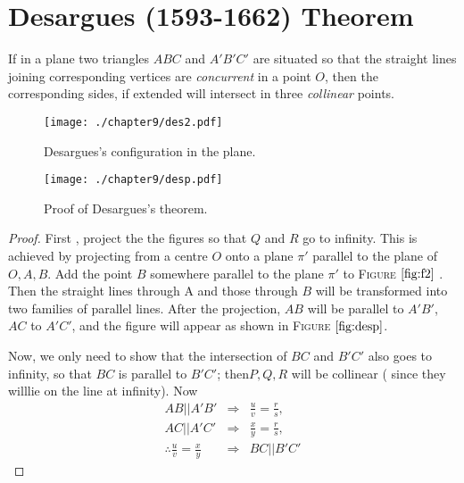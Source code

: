 \section{Desargues (1593-1662) Theorem}
\begin{theorem}

If in a plane two triangles $ABC$ and $A'B'C'$ are situated so that the straight lines joining corresponding vertices are \emph{concurrent} in a point $O$, then the corresponding sides, if extended will intersect in three \emph{collinear} points. 

\begin{figure}[htbp] %
\centering
\texttt{[image: ./chapter9/des2.pdf]} 
\caption{Desargues's configuration in the plane.} 
\label{fig:des2}
\end{figure}

\begin{figure}[htbp] %
\centering
\texttt{[image: ./chapter9/desp.pdf]} 
\caption{Proof of Desargues's theorem.} 
\label{fig:desp}
\end{figure}

\begin{proof}

First , project the the figures so that $Q$ and $R$ go to infinity. This is achieved by projecting from a centre $O$ onto a plane $\pi'$ parallel to the plane of $O, A, B$. Add the point $B$ somewhere parallel to the plane $\pi'$ to \textsc{Figure $\ref{fig:f2}$} . Then the straight lines through A and those through $B$ will be transformed into two families of parallel lines. After the projection, $AB$ will be parallel to $A'B'$, $AC$ to $A'C'$, and the figure will appear as shown in \textsc{Figure $ \ref{fig:desp}$}. 

Now, we only need to show that the intersection of $BC$ and $B'C'$ also goes to infinity, so that $BC$ is parallel to $B'C'$; then$P, Q, R$ will be collinear ( since they willlie on the line at infinity). Now
\begin{eqnarray*}
AB|| A'B' &\Rightarrow& \frac{u}{v}=\frac{r}{s},\\
AC ||A'C' &\Rightarrow& \frac{x}{y}=\frac{r}{s},\\
\therefore \frac{u}{v} =\frac{x}{y} &\Rightarrow& BC ||B'C' 
\end{eqnarray*}
\end{proof}
\end{theorem}

